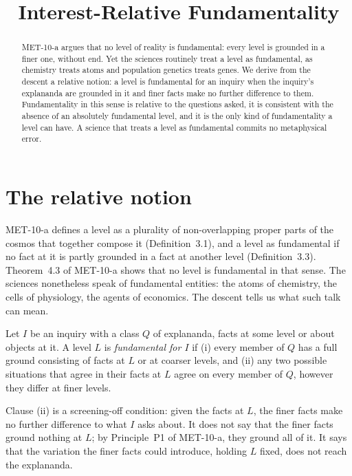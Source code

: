 \documentclass{situationist-preprint}
\title{Interest-Relative Fundamentality}
\begin{document}
\maketitle

\begin{abstract}
MET-10-a argues that no level of reality is fundamental: every level is grounded in a finer one, without end. Yet the sciences routinely treat a level as fundamental, as chemistry treats atoms and population genetics treats genes. We derive from the descent a relative notion: a level is fundamental for an inquiry when the inquiry's explananda are grounded in it and finer facts make no further difference to them. Fundamentality in this sense is relative to the questions asked, it is consistent with the absence of an absolutely fundamental level, and it is the only kind of fundamentality a level can have. A science that treats a level as fundamental commits no metaphysical error.
\end{abstract}

\section{The relative notion}

MET-10-a defines a level as a plurality of non-overlapping proper parts of the cosmos that together compose it (Definition~3.1), and a level as fundamental if no fact at it is partly grounded in a fact at another level (Definition~3.3). Theorem~4.3 of MET-10-a shows that no level is fundamental in that sense. The sciences nonetheless speak of fundamental entities: the atoms of chemistry, the cells of physiology, the agents of economics. The descent tells us what such talk can mean.

\begin{definition}\label{d:rel}
Let $I$ be an inquiry with a class $Q$ of explananda, facts at some level or about objects at it. A level $L$ is \emph{fundamental for $I$} if (i) every member of $Q$ has a full ground consisting of facts at $L$ or at coarser levels, and (ii) any two possible situations that agree in their facts at $L$ agree on every member of $Q$, however they differ at finer levels.
\end{definition}

Clause (ii) is a screening-off condition: given the facts at $L$, the finer facts make no further difference to what $I$ asks about. It does not say that the finer facts ground nothing at $L$; by Principle~P1 of MET-10-a, they ground all of it. It says that the variation the finer facts could introduce, holding $L$ fixed, does not reach the explananda.
\end{document}
